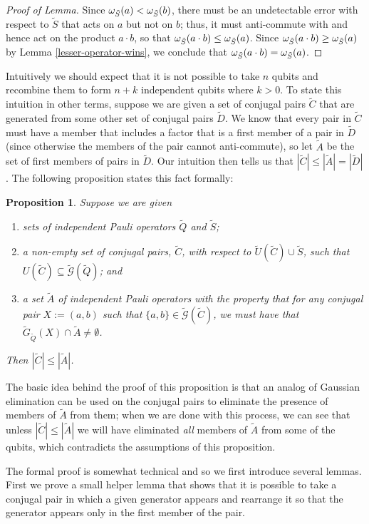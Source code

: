 \documentclass[twocolumn,showpacs,preprintnumbers,amsmath,amssymb,nofootinbib,pra,floatfix]{revtex4-1}
\newtheorem{proposition}{Proposition}
\newenvironment{remark}[1][Remark]{\begin{trivlist}
\item[\hskip \labelsep {\bfseries #1}]}{\end{trivlist}}
\newcommand{\set}{\tilde}
\newcommand{\genfun}{\tilde{\mathcal{G}}}
\begin{document}
\begin{proof}[Proof of Lemma]
Since $\om_{\set S}(a)<\om_{\set S}(b)$, there must be an undetectable error with respect to $\set S$ that acts on $a$ but not on $b$;  thus, it must anti-commute with and hence act on the product $a\cdot b$, so that $\om_{\set S}(a\cdot b)\le \om_{\set S}(a)$.  Since $\om_{\set S}(a\cdot b)\ge \om_{\set S}(a)$ by Lemma \ref{lesser-operator-wins}, we conclude that $\om_{\set S}(a\cdot b) = \om_{\set S}(a)$.
\end{proof}
\begin{remark}
Intuitively we should expect that it is not possible to take $n$ qubits and recombine them to form $n+k$ independent qubits where $k>0$.  To state this intuition in other terms, suppose we are given a set of conjugal pairs $\set C$ that are generated from some other set of conjugal pairs $\set D$.  We know that every pair in $\set C$ must have a member that includes a factor that is a first member of a pair in $\set D$ (since otherwise the members of the pair cannot anti-commute), so let $\set A$ be the set of first members of pairs in $\set D$.  Our intuition then tells us that $|\set C|\le |\set A|=|\set D|$.  The following proposition states this fact formally:
\end{remark}
\begin{proposition}
\label{bound-on-recombinations}
Suppose we are given
\begin{enumerate}
\item sets of independent Pauli operators $\set Q$ and $\set S$;
\item a non-empty set of conjugal pairs, $\set C$, with respect to $\set U(\set C) \cup \set S$, such that $U(\set C)\subseteq \genfun(\set Q)$; and
\item a set $\set A$ of independent Pauli operators with the property that for any conjugal pair $X:=(a,b)$ such that $\{a,b\}\in\genfun(\set C)$, we must have that $\set G_{\set Q}(X) \cap \set A \ne \emptyset$.
\end{enumerate}
Then $|\set C|\le|\set A|$.
\end{proposition}
\begin{remark}
The basic idea behind the proof of this proposition is that an analog of Gaussian elimination can be used on the conjugal pairs to eliminate the presence of members of $\set A$ from them;  when we are done with this process, we can see that unless $|\set C|\le |\set A|$ we will have eliminated \emph{all} members of $\set A$ from some of the qubits, which contradicts the assumptions of this proposition.

The formal proof is somewhat technical and so we first introduce several lemmas.  First we prove a small helper lemma that shows that it is possible to take a conjugal pair in which a given generator appears and rearrange it so that the generator appears only in the first member of the pair.
\end{remark}
\end{document}
